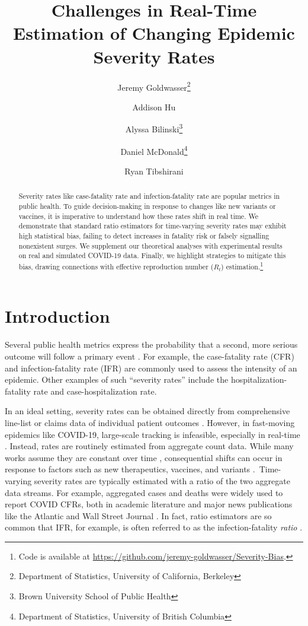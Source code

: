 \documentclass{article}
\title{Challenges in Real-Time Estimation of Changing Epidemic Severity Rates}
\author{Jeremy Goldwasser\thanks{Department of Statistics, University of California, Berkeley} \and 
        Addison Hu\footnotemark[1] \and
        Alyssa Bilinski\thanks{Brown University School of Public Health} \and
        Daniel McDonald\thanks{Department of Statistics, University of British Columbia} \and
        Ryan Tibshirani\footnotemark[1]}
\begin{document}
\maketitle
\begin{abstract}
    Severity rates like case-fatality rate and infection-fatality rate are popular metrics in public health. To guide decision-making in response to changes like new variants or vaccines, it is imperative to understand how these rates shift in real time. We demonstrate that standard ratio estimators for time-varying severity rates may exhibit high statistical bias, failing to detect increases in fatality risk or falsely signalling nonexistent surges. We supplement our theoretical analyses with experimental results on real and simulated COVID-19 data. Finally, we highlight strategies to mitigate this bias, drawing connections with effective reproduction number ($R_t$) estimation.\footnote{Code is available at \url{https://github.com/jeremy-goldwasser/Severity-Bias}.}
\end{abstract}
\section{Introduction}

Several public health metrics express the probability that a second, more serious outcome will follow a primary event \citep{nishiuraEx1, nishiuraEx2, cfr_line_list, UKpaper, HFR_line_list1, HFR_linelist2, HFR_linelist3, lancet_ifr, timevar_ifr}. 
For example, the case-fatality rate (CFR) and infection-fatality rate (IFR) are commonly used to assess the intensity of an epidemic. 
Other examples of such “severity rates” include the hospitalization-fatality rate and case-hospitalization rate. 

In an ideal setting, severity rates can be obtained directly from comprehensive line-list or claims data of individual patient outcomes \citep{HFR_line_list1,HFR_linelist2,HFR_linelist3,cfr_line_list}. However, in fast-moving epidemics like COVID-19, large-scale tracking is infeasible, especially in real-time \citep{UKpaper}. Instead, rates are routinely estimated from aggregate count data. While many works assume they are constant over time \citep{reich2012estimating,ghani,jewell2007nonparametric,lancet_controversial}, consequential shifts can occur in response to factors such as new therapeutics, vaccines, and variants \citep{nyt}. Time-varying severity rates are typically estimated with a ratio of the two aggregate data streams.  For example, aggregated cases and deaths were widely used to report COVID CFRs, both in academic literature \citep{germany,horita2022global,timevar_ifr,yuan2020monitoring,LIU2023100350} and major news publications like the Atlantic \citep{atlantic} and Wall Street Journal \citep{wsj}. In fact, ratio estimators are so common that IFR, for example, is often referred to as the infection-fatality \textit{ratio} \citep{timevar_ifr, lancet_ifr}.
\end{document}
